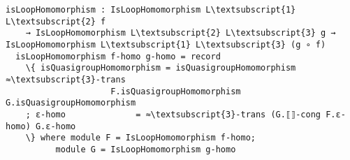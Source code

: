 \begin{comment}
\begin{Verbatim}[commandchars=\\\{\},samepage=true]
  isQuasigroupMonomorphism : IsQuasigroupMonomorphism Q\textsubscript{1} Q\textsubscript{2} f
    → IsQuasigroupMonomorphism Q\textsubscript{2} Q\textsubscript{3} g  
    → IsQuasigroupMonomorphism  Q\textsubscript{1} Q\textsubscript{3} (g ∘ f)
  isQuasigroupMonomorphism f-mono g-mono = record
    \{ isQuasigroupHomomorphism = isQuasigroupHomomorphism 
					 F.isQuasigroupHomomorphism
					 G.isQuasigroupHomomorphism
    ; injective = F.injective ∘ G.injective
    \} where module F = IsQuasigroupMonomorphism f-mono;  
	      module G = IsQuasigroupMonomorphism g-mono

\end{Verbatim}
\begin{Verbatim}[commandchars=\\\{\},samepage=true]
  isQuasigroupIsomorphism : IsQuasigroupIsomorphism Q\textsubscript{1} Q\textsubscript{2} f
    → IsQuasigroupIsomorphism Q\textsubscript{2} Q\textsubscript{3} g → IsQuasigroupIsomorphism  Q\textsubscript{1} Q\textsubscript{3} (g ∘ f)
  isQuasigroupIsomorphism f-iso g-iso = record
    \{ isQuasigroupMonomorphism = isQuasigroupMonomorphism F.isQuasigroupMonomorphism
					 G.isQuasigroupMonomorphism
    ; surjective               = Func.surjective (_≈_ Q\textsubscript{1}) (_≈_ Q\textsubscript{2}) (_≈_ Q\textsubscript{3}) 
				≈\textsubscript{3}-trans G.⟦⟧-cong F.surjective G.surjective
    \} where module F = IsQuasigroupIsomorphism f-iso; 
	      module G = IsQuasigroupIsomorphism g-iso

\end{Verbatim}
\end{comment}
\begin{comment}
module _ \{L\textsubscript{1} : RawLoop a ℓ\textsubscript{1}\} \{L\textsubscript{2} : RawLoop b ℓ\textsubscript{2}\} \{L\textsubscript{3} : RawLoop c ℓ\textsubscript{3}\}
         (open RawLoop)  (≈\textsubscript{3}-trans : Transitive (_≈_ L\textsubscript{3}))
         \{f : Carrier L\textsubscript{1} → Carrier L\textsubscript{2}\}  \{g : Carrier L\textsubscript{2} → Carrier L\textsubscript{3}\} where
\end{comment}
\begin{Verbatim}[commandchars=\\\{\},samepage=true]
  isLoopHomomorphism : IsLoopHomomorphism L\textsubscript{1} L\textsubscript{2} f
    → IsLoopHomomorphism L\textsubscript{2} L\textsubscript{3} g → IsLoopHomomorphism L\textsubscript{1} L\textsubscript{3} (g ∘ f)
  isLoopHomomorphism f-homo g-homo = record
    \{ isQuasigroupHomomorphism = isQuasigroupHomomorphism ≈\textsubscript{3}-trans
                     F.isQuasigroupHomomorphism G.isQuasigroupHomomorphism
    ; ε-homo              = ≈\textsubscript{3}-trans (G.⟦⟧-cong F.ε-homo) G.ε-homo
    \} where module F = IsLoopHomomorphism f-homo;
	      module G = IsLoopHomomorphism g-homo
\end{Verbatim}
